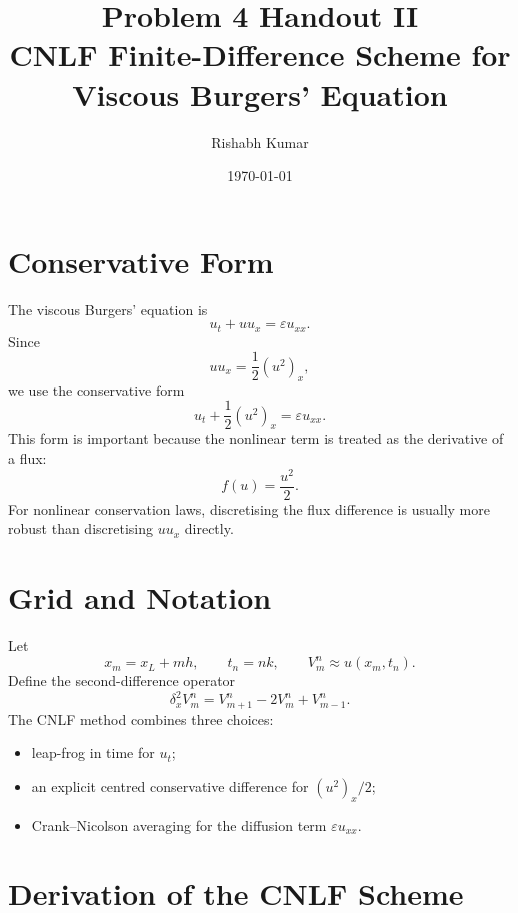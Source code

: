 \documentclass[11pt]{article}
\title{Problem 4 Handout II\\CNLF Finite-Difference Scheme for Viscous Burgers' Equation}
\author{Rishabh Kumar}
\date{\today}
\begin{document}
\maketitle

\section{Conservative Form}

The viscous Burgers' equation is
\begin{equation}
    u_t+u u_x=\varepsilon u_{xx}.
    \label{eq:burgers}
\end{equation}
Since
\begin{equation}
    u u_x=\frac{1}{2}(u^2)_x,
\end{equation}
we use the conservative form
\begin{equation}
    u_t+\frac{1}{2}(u^2)_x=\varepsilon u_{xx}.
    \label{eq:conservative}
\end{equation}
This form is important because the nonlinear term is treated as the derivative of a
flux:
\begin{equation}
    f(u)=\frac{u^2}{2}.
\end{equation}
For nonlinear conservation laws, discretising the flux difference is usually more
robust than discretising $u u_x$ directly.

\section{Grid and Notation}

Let
\begin{equation}
    x_m=x_L+mh,
    \qquad
    t_n=nk,
    \qquad
    V_m^n\approx u(x_m,t_n).
\end{equation}
Define the second-difference operator
\begin{equation}
    \delta_x^2 V_m^n
    =
    V_{m+1}^n-2V_m^n+V_{m-1}^n.
\end{equation}
The CNLF method combines three choices:
\begin{itemize}
    \item leap-frog in time for $u_t$;
    \item an explicit centred conservative difference for $(u^2)_x/2$;
    \item Crank--Nicolson averaging for the diffusion term $\varepsilon u_{xx}$.
\end{itemize}

\section{Derivation of the CNLF Scheme}
\end{document}

